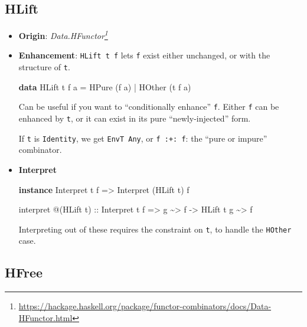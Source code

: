 \documentclass[]{article}
\newenvironment{Shaded}{}{}
\newcommand{\DataTypeTok}[1]{\textcolor[rgb]{0.56,0.13,0.00}{#1}}
\newcommand{\KeywordTok}[1]{\textcolor[rgb]{0.00,0.44,0.13}{\textbf{#1}}}
\newcommand{\NormalTok}[1]{#1}
\newcommand{\OperatorTok}[1]{\textcolor[rgb]{0.40,0.40,0.40}{#1}}
\newcommand{\OtherTok}[1]{\textcolor[rgb]{0.00,0.44,0.13}{#1}}
\renewcommand{\href}[2]{#2\footnote{\url{#1}}}
\begin{document}
\hypertarget{hlift}{%
\subsection{HLift}\label{hlift}}

\begin{itemize}
\item
  \textbf{Origin}:
  \emph{\href{https://hackage.haskell.org/package/functor-combinators/docs/Data-HFunctor.html}{Data.HFunctor}}
\item
  \textbf{Enhancement}: \texttt{HLift\ t\ f} lets \texttt{f} exist either
  unchanged, or with the structure of \texttt{t}.

\begin{Shaded}
\begin{Highlighting}[]
\KeywordTok{data} \DataTypeTok{HLift}\NormalTok{ t f a}
    \OtherTok{=} \DataTypeTok{HPure}\NormalTok{  (f a)}
    \OperatorTok{|} \DataTypeTok{HOther}\NormalTok{ (t f a)}
\end{Highlighting}
\end{Shaded}

  Can be useful if you want to ``conditionally enhance'' \texttt{f}. Either
  \texttt{f} can be enhanced by \texttt{t}, or it can exist in its pure
  ``newly-injected'' form.

  If \texttt{t} is \texttt{Identity}, we get \texttt{EnvT\ Any}, or
  \texttt{f\ :+:\ f}: the ``pure or impure'' combinator.
\item
  \textbf{Interpret}

\begin{Shaded}
\begin{Highlighting}[]
\KeywordTok{instance} \DataTypeTok{Interpret}\NormalTok{ t f }\OtherTok{=>} \DataTypeTok{Interpret}\NormalTok{ (}\DataTypeTok{HLift}\NormalTok{ t) f}

\NormalTok{interpret }\OperatorTok{@}\NormalTok{(}\DataTypeTok{HLift}\NormalTok{ t)}
\OtherTok{    ::} \DataTypeTok{Interpret}\NormalTok{ t f}
    \OtherTok{=>}\NormalTok{ g }\OperatorTok{\textasciitilde{}>}\NormalTok{ f}
    \OtherTok{{-}>} \DataTypeTok{HLift}\NormalTok{ t g }\OperatorTok{\textasciitilde{}>}\NormalTok{ f}
\end{Highlighting}
\end{Shaded}

  Interpreting out of these requires the constraint on \texttt{t}, to handle the
  \texttt{HOther} case.
\end{itemize}

\hypertarget{hfree}{%
\subsection{HFree}\label{hfree}}
\end{document}
